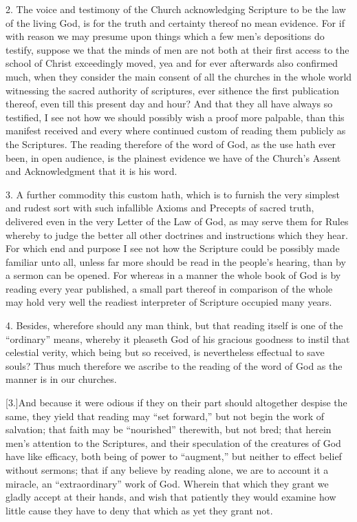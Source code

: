 2. The voice and testimony of the Church acknowledging Scripture to be the law of the living God, is for the truth and certainty thereof no mean evidence. For if with reason we may presume upon things which a few men’s depositions do testify, suppose we that the minds of men are not both at their first access to the school of Christ exceedingly moved, yea and for ever afterwards also confirmed much, when they consider the main consent of all the churches in the whole world witnessing the sacred authority of scriptures, ever sithence the first publication thereof, even till this present day and hour? And that they all have always so testified, I see not how we should possibly wish a proof more palpable, than this manifest received and every where continued custom of reading them publicly as the Scriptures. The reading therefore of the word of God, as the use hath ever been, in open audience, is the plainest evidence we have of the Church’s Assent and Acknowledgment that it is his word.

3. A further commodity this custom hath, which is to furnish the very simplest and rudest sort with such infallible Axioms and Precepts of sacred truth, delivered even in the very Letter of the Law of God, as may serve them for Rules whereby to judge the better all other doctrines and instructions which they hear. For which end and purpose I see not  how the Scripture could be possibly made familiar unto all, unless far more should be read in the people’s hearing, than by a sermon can be opened.
 For whereas in a manner the whole book of God is by reading every year published, a small part thereof in comparison of the whole may hold very well the readiest interpreter of Scripture occupied many years.

4. Besides, wherefore should any man think, but that reading itself is one of the “ordinary” means, whereby it pleaseth God of his gracious goodness to instil that celestial verity, which being but so received, is nevertheless effectual to save souls? Thus much therefore we ascribe to the reading of the word of God as the manner is in our churches.

[3.]And because it were odious if they on their part should altogether despise the same, they yield that reading may “set forward,” but not begin the work of salvation; that faith may be “nourished” therewith, but not bred; that herein men’s attention to the Scriptures, and their speculation of the creatures of God have like efficacy, both being of power to “augment,” but neither to effect belief without sermons; that if any believe by reading alone, we are to account it a miracle, an “extraordinary” work of God. Wherein that which they grant we gladly accept at their hands, and wish that patiently they would examine how little cause they have to deny that which as yet they grant not.

